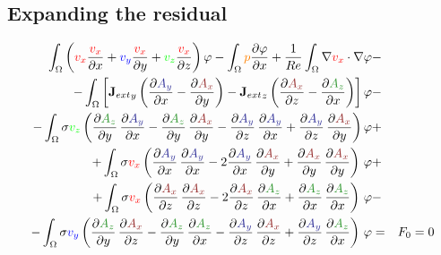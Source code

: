 \documentclass[smallextended]{svjour3}       %
\begin{document}
		\subsection{Expanding the residual}
		\begin{eqnarray}
			\int_{\Omega} \left(\textcolor{red}{v_x} \frac{\textcolor{red}{v_x}}{\partial x} + \textcolor{blu}{v_y} \frac{\textcolor{red}{v_x}}{\partial y} + \textcolor{gre}{v_z} \frac{\textcolor{red}{v_x}}{\partial z}\right) \varphi
			- \int_{\Omega} \textcolor{orange}{p} \frac{\partial \varphi}{\partial x}
			+ \frac{1}{Re} \int_{\Omega} \nabla \textcolor{red}{v_x} \cdot \nabla \varphi
			\nonumber & -\\
			- \int_{\Omega} \left[{\mathbf{J}_{ext}}_y \left(\frac{\partial \textcolor{darkblu}{A_y}}{\partial x} - \frac{\partial \textcolor{darkred}{A_x}}{\partial y}\right) - {\mathbf{J}_{ext}}_z \left(\frac{\partial \textcolor{darkred}{A_x}}{\partial z} - \frac{\partial \textcolor{darkgre}{A_z}}{\partial x}\right)\right] \varphi			
			\nonumber & -\\
			- \int_{\Omega} \sigma \textcolor{gre}{v_z} \left(\frac{\partial \textcolor{darkgre}{A_z}}{\partial y}\,\frac{\partial \textcolor{darkblu}{A_y}}{\partial x} - \frac{\partial \textcolor{darkgre}{A_z}}{\partial y}\,\frac{\partial \textcolor{darkred}{A_x}}{\partial y} - \frac{\partial \textcolor{darkblu}{A_y}}{\partial z}\,\frac{\partial \textcolor{darkblu}{A_y}}{\partial x} + \frac{\partial \textcolor{darkblu}{A_y}}{\partial z}\,\frac{\partial \textcolor{darkred}{A_x}}{\partial y} \right) \varphi& +\nonumber \\			
			+ \int_{\Omega} \sigma \textcolor{red}{v_x} \left(\frac{\partial \textcolor{darkblu}{A_y}}{\partial x}\,\frac{\partial \textcolor{darkblu}{A_y}}{\partial x} - 2 \frac{\partial \textcolor{darkblu}{A_y}}{\partial x}\,\frac{\partial \textcolor{darkred}{A_x}}{\partial y} + \frac{\partial \textcolor{darkred}{A_x}}{\partial y}\,\frac{\partial \textcolor{darkred}{A_x}}{\partial y} \right)\, \varphi& +\nonumber \\			
			+ \int_{\Omega} \sigma \textcolor{red}{v_x} \left(\frac{\partial \textcolor{darkred}{A_x}}{\partial z}\,\frac{\partial \textcolor{darkred}{A_x}}{\partial z} - 2 \frac{\partial \textcolor{darkred}{A_x}}{\partial z}\,\frac{\partial \textcolor{darkgre}{A_z}}{\partial x} + \frac{\partial \textcolor{darkgre}{A_z}}{\partial x}\,\frac{\partial \textcolor{darkgre}{A_z}}{\partial x} \right)\, \varphi& -\nonumber \\			
			- \int_{\Omega} \sigma \textcolor{blu}{v_y} \left(\frac{\partial \textcolor{darkgre}{A_z}}{\partial y}\,\frac{\partial \textcolor{darkred}{A_x}}{\partial z} - \frac{\partial \textcolor{darkgre}{A_z}}{\partial y}\,\frac{\partial \textcolor{darkgre}{A_z}}{\partial x} - \frac{\partial \textcolor{darkblu}{A_y}}{\partial z}\,\frac{\partial \textcolor{darkred}{A_x}}{\partial z}  + \frac{\partial \textcolor{darkblu}{A_y}}{\partial z}\,\frac{\partial \textcolor{darkgre}{A_z}}{\partial x} \right)\, \varphi& = & F_0 = 0 \\			

\end{eqnarray}
\end{document}

